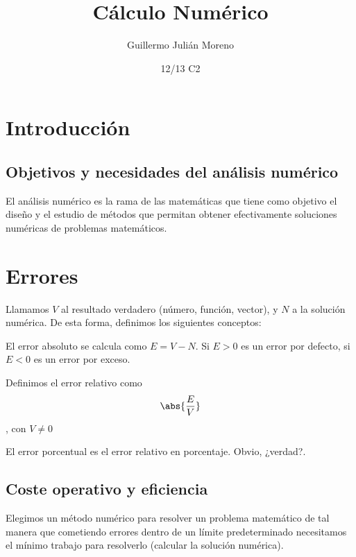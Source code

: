 \documentclass[nochap]{apuntes}
\author{Guillermo Julián Moreno}
\date{12/13 C2}
\title{Cálculo Numérico}
\begin{document}
\pagestyle{plain}
\maketitle
\newpage

\tableofcontents

\newpage

\section{Introducción}
\subsection{Objetivos y necesidades del análisis numérico}

El análisis numérico es la rama de las matemáticas que tiene como objetivo el diseño y el estudio de métodos que permitan obtener efectivamente soluciones numéricas de problemas matemáticos.

\section{Errores}

Llamamos $V$ al resultado verdadero (número, función, vector), y $N$ a la solución numérica. De esta forma, definimos los siguientes conceptos:

\begin{defn} El error absoluto se calcula como $E = V - N$. Si $E > 0$ es un error por defecto, si $E<0$ es un error por exceso.
\end{defn}

\begin{defn} Definimos el error relativo como \[ \abs{\frac{E}{V}}\], con $V \neq 0$\end{defn}

\begin{defn} El error porcentual es el error relativo en porcentaje. Obvio, ¿verdad?.\end{defn}

\subsection{Coste operativo y eficiencia}

Elegimos un método numérico para resolver un problema matemático de tal manera que cometiendo errores dentro de un límite predeterminado necesitamos el mínimo trabajo para resolverlo (calcular la solución numérica).
\end{document}
